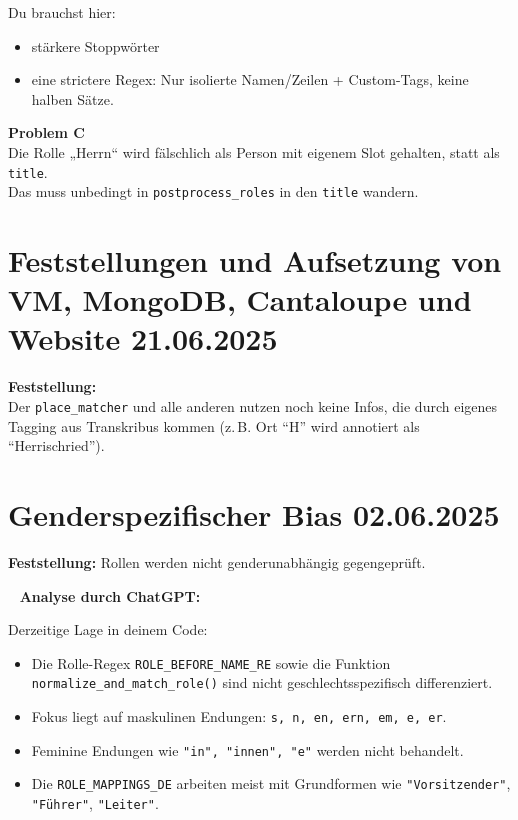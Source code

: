 \documentclass{article}
\begin{document}
Du brauchst hier:
\begin{itemize}
  \item stärkere Stoppwörter
  \item eine strictere Regex: Nur isolierte Namen/Zeilen + Custom-Tags, keine halben Sätze.
\end{itemize}

\vspace{0.5em}

\textbf{Problem C} \\ 
Die Rolle „Herrn“ wird fälschlich als Person mit eigenem Slot gehalten, statt als \texttt{title}. \\
Das muss unbedingt in \texttt{postprocess\_roles} in den \texttt{title} wandern.

\noindent\hrulefill

\section{Feststellungen und Aufsetzung von VM, MongoDB, Cantaloupe und Website \small 21.06.2025}

\textbf{Feststellung:} \\
Der \texttt{place\_matcher} und alle anderen nutzen noch keine Infos, die durch eigenes Tagging aus Transkribus kommen (z.\,B. Ort ``H'' wird annotiert als ``Herrischried'').





\noindent\hrulefill
\section{Genderspezifischer Bias \small 02.06.2025}

\textbf{Feststellung:} Rollen werden nicht genderunabhängig gegengeprüft.

\faBrain~ \textbf{Analyse durch ChatGPT:}

Derzeitige Lage in deinem Code:

\begin{itemize}
  \item Die Rolle-Regex \texttt{ROLE\_BEFORE\_NAME\_RE} sowie die Funktion \texttt{normalize\_and\_match\_role()} sind nicht geschlechtsspezifisch differenziert.
  \item Fokus liegt auf maskulinen Endungen: \texttt{s, n, en, ern, em, e, er}.
  \item Feminine Endungen wie \texttt{"in", "innen", "e"} werden nicht behandelt.
  \item Die \texttt{ROLE\_MAPPINGS\_DE} arbeiten meist mit Grundformen wie \texttt{"Vorsitzender"}, \texttt{"Führer"}, \texttt{"Leiter"}.
\end{itemize}
\end{document}
